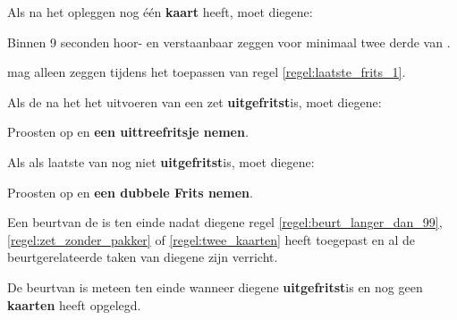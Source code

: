 \newpage
{}
\label{hoofdstuk:beurten_en_zetten_einde}


\vervolgLijst{}
\item Als \eenSpeler na het opleggen nog \'e\'en \textbf{kaart} heeft, moet diegene:
\puntLijst{}
\item Binnen 9 seconden hoor- en verstaanbaar  zeggen voor minimaal twee derde van \alleSpelersN.
\eindPuntLijst{}
\label{regel:laatste_frits_1}
\eindLijst{}

\vervolgLijst{}
\item \EenSpeler mag alleen  zeggen tijdens het toepassen van regel \ref{regel:laatste_frits_1}.
\eindLijst{}


\vervolgLijst{}
\item Als de \huidigeSpeler na het het uitvoeren van een zet \textbf{uitgefritst}\footnotemark[1] is, moet diegene:
\puntLijst{}
\item Proosten op  en \textbf{een uittreefritsje nemen}\footnotemark[2].
\eindPuntLijst{}
\label{regel:laatste_frits_2}
\eindLijst{}

\vervolgLijst{}
\item Als \eenSpeler als laatste van \alleSpelers nog niet \textbf{uitgefritst}\footnotemark[1] is, moet diegene:
\puntLijst{}
\item Proosten op  en \textbf{een dubbele Frits nemen}\footnotemark[3].
\eindPuntLijst{}
\eindLijst{}


\vervolgLijst{}
\item Een beurt\footnotemark[4] van de \huidigeSpeler is ten einde nadat diegene regel \ref{regel:beurt_langer_dan_99}, \ref{regel:zet_zonder_pakker} of \ref{regel:twee_kaarten} heeft toegepast en al de beurtgerelateerde taken van diegene zijn verricht.
\eindLijst{}

\vervolgLijst{}
\item De beurt\footnotemark[4] van \eenSpeler is meteen ten einde wanneer diegene \textbf{uitgefritst}\footnotemark[1] is en nog geen \textbf{kaarten} heeft opgelegd.
\eindLijst{}


